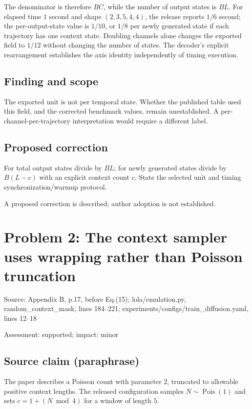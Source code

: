 \documentclass[11pt]{article}
\begin{document}
The denominator is therefore \(BC\), while the number of output states is \(BL\). For elapsed time \(1\) second and shape \((2,3,5,4,4)\), the release reports \(1/6\) second; the per-output-state value is \(1/10\), or \(1/8\) per newly generated state if each trajectory has one context state. Doubling channels alone changes the exported field to \(1/12\) without changing the number of states. The decoder’s explicit rearrangement establishes the axis identity independently of timing execution.

\subsection*{Finding and scope}

The exported unit is not per temporal state. Whether the published table used this field, and the corrected benchmark values, remain unestablished. A per-channel-per-trajectory interpretation would require a different label.

\subsection*{Proposed correction}

For total output states divide by \(BL\); for newly generated states divide by \(B(L-c)\) with an explicit context count \(c\). State the selected unit and timing synchronization/warmup protocol.

A proposed correction is described; author adoption is not established.

\section*{Problem 2: The context sampler uses wrapping rather than Poisson truncation}

Source: Appendix B, p.17, before Eq.(15); lola/emulation.py, random\_context\_mask, lines 184–221; experiments/configs/train\_diffusion.yaml, lines 12–18

Assessment: supported; impact: minor

\subsection*{Source claim (paraphrase)}

The paper describes a Poisson count with parameter \(2\), truncated to allowable positive context lengths. The released configuration samples \(N\sim\operatorname{Pois}(1)\) and sets \(c=1+(N\bmod4)\) for a window of length \(5\).
\end{document}
